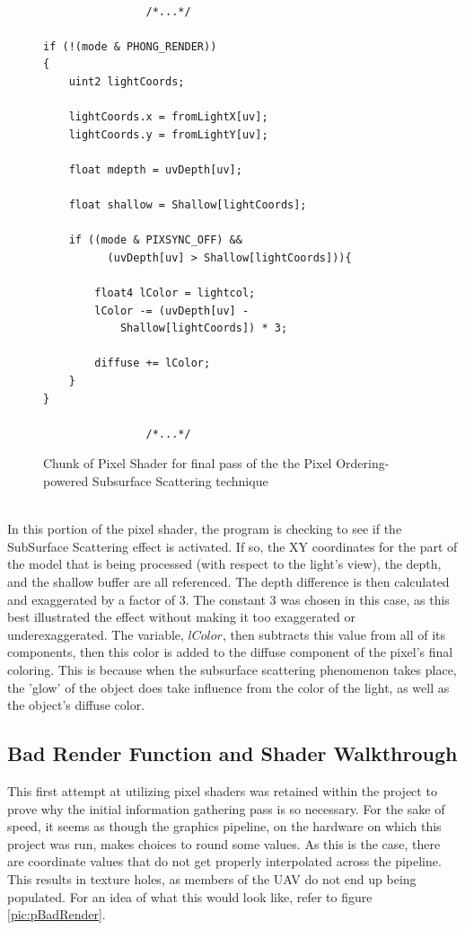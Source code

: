 \documentclass[a4paper, 12pt]{article}
\begin{document}
\begin{figure}[!htb]
\begin{lstlisting}[language=HLSL]

			    /*...*/

if (!(mode & PHONG_RENDER))
{
	uint2 lightCoords;

	lightCoords.x = fromLightX[uv];
	lightCoords.y = fromLightY[uv];

	float mdepth = uvDepth[uv];

	float shallow = Shallow[lightCoords];

	if ((mode & PIXSYNC_OFF) && 
		  (uvDepth[uv] > Shallow[lightCoords])){

		float4 lColor = lightcol;
		lColor -= (uvDepth[uv] - 
			Shallow[lightCoords]) * 3;
			
		diffuse += lColor;
	}
}

			    /*...*/

\end{lstlisting}
\caption{Chunk of Pixel Shader for final pass of the the Pixel Ordering-powered Subsurface Scattering technique}
\label{code:SSSFinal}
\end{figure}

\noindent \\ In this portion of the pixel shader, the program is checking to
see if the SubSurface Scattering effect is activated. If so, the XY
coordinates for the part of the model that is being processed (with respect to
the light's view), the depth, and the shallow buffer are all referenced. The
depth difference is then calculated and exaggerated by a factor of 3. The
constant 3 was chosen in this case, as this best illustrated the effect
without making it too exaggerated or underexaggerated. The variable, $lColor$,
then subtracts this value from all of its components, then this color is added
to the diffuse component of the pixel's final coloring. This is because when
the subsurface scattering phenomenon takes place, the 'glow' of the object
does take influence from the color of the light, as well as the object's
diffuse color.


\subsection{Bad Render Function and Shader Walkthrough}
\label{subsubsection:BadRender}

This first attempt at utilizing pixel shaders was retained within the project
to prove why the initial information gathering pass is so necessary. For the
sake of speed, it seems as though the graphics pipeline, on the hardware on
which this project was run, makes choices to round some values. As this is the
case, there are coordinate values that do not get properly interpolated across
the pipeline. This results in texture holes, as members of the UAV do not end
up being populated. For an idea of what this would look like, refer to figure
\ref{pic:pBadRender}.
\end{document}
